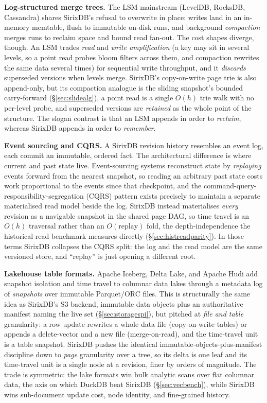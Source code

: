 \documentclass[11pt,a4paper,oneside]{report}
\theoremstyle{sirixthm}
\begin{document}
\textbf{Log-structured merge trees.} The LSM mainstream (LevelDB, RocksDB, Cassandra) shares SirixDB's
refusal to overwrite in place: writes land in an in-memory memtable, flush to immutable on-disk runs, and
background \emph{compaction} merges runs to reclaim space and bound read fan-out. The cost shapes diverge,
though. An LSM trades \emph{read} and \emph{write amplification} (a key may sit in several levels, so a
point read probes bloom filters across them, and compaction rewrites the same data several times) for
sequential write throughput, and it \emph{discards} superseded versions when levels merge. SirixDB's
copy-on-write page trie is also append-only, but its compaction analogue is the sliding snapshot's bounded
carry-forward (\S\ref{sec:slidealg}), a point read is a single $O(h)$ trie walk with no per-level probe,
and superseded versions are \emph{retained} as the whole point of the structure. The slogan contrast is
that an LSM appends in order to \emph{reclaim}, whereas SirixDB appends in order to \emph{remember}.

\textbf{Event sourcing and CQRS.} A SirixDB revision history resembles an event log, each commit an
immutable, ordered fact. The architectural difference is where current and past state live. Event-sourcing
systems reconstruct state by \emph{replaying} events forward from the nearest snapshot, so reading an
arbitrary past state costs work proportional to the events since that checkpoint, and the
command-query-responsibility-segregation (CQRS) pattern exists precisely to maintain a separate
materialised read model beside the log. SirixDB instead materialises \emph{every} revision as a navigable
snapshot in the shared page DAG, so time travel is an $O(h)$ traversal rather than an $O(\text{replay})$
fold, the depth-independence the historical-read benchmark measures directly (\S\ref{sec:histreadparity}).
In those terms SirixDB collapses the CQRS split: the log and the read model are the same versioned store,
and ``replay'' is just opening a different root.

\textbf{Lakehouse table formats.} Apache Iceberg, Delta Lake, and Apache Hudi add snapshot isolation and
time travel to columnar data lakes through a metadata log of \emph{snapshots} over immutable
Parquet/ORC files. This is structurally the same idea as SirixDB's S3 backend, immutable data objects
plus an authoritative manifest naming the live set (\S\ref{sec:storagespi}), but pitched at \emph{file
and table} granularity: a row update rewrites a whole data file (copy-on-write tables) or appends a
delete-vector and a new file (merge-on-read), and the time-travel unit is a table snapshot. SirixDB
pushes the identical immutable-objects-plus-manifest discipline down to \emph{page} granularity over a
tree, so its delta is one leaf and its time-travel unit is a single node at a revision, finer by orders of
magnitude. The trade is symmetric: the lake formats win bulk analytic scans over flat columnar data, the
axis on which DuckDB beat SirixDB (\S\ref{sec:vecbench}), while SirixDB wins sub-document update cost,
node identity, and fine-grained history.
\end{document}
